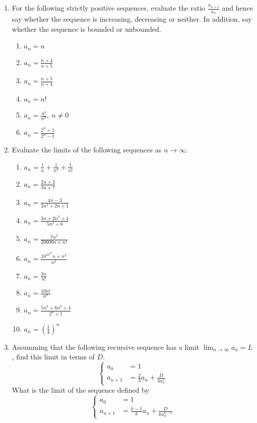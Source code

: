 \documentclass[11pt,a4paper,titlepage,oneside,openany]{article}
\numberwithin{equation}{section}
\numberwithin{algorithm}{section}
\numberwithin{figure}{section}
\numberwithin{table}{section}
\begin{document}
\begin{enumerate}
\item For the following strictly positive sequences, evaluate the ratio $\frac{a_{n+1}}{a_n}$ and hence say whether the sequence is increasing, decreasing or neither. In addition, say whether the sequence is bounded or unbounded.
  \begin{multicols}{2}
    \begin{enumerate}
    \item $a_n=n$
    \item $a_n=\frac{n+4}{n+5}$
    \item $a_n=\frac{n+5}{n+4}$
    \item $a_n=n!$
    \item $a_n=\frac{n!}{n^n},\ n\ne 0$
    \item $a_n=\frac{2^n+1}{2^n-1}$
    \end{enumerate}        
  \end{multicols}

\item Evaluate the limits of the following sequences as $n \to \infty$.
    \begin{multicols}{2}
    \begin{enumerate}
    \item $a_n=\frac{1}{n}+\frac{1}{n^2}+\frac{1}{n!}$
    \item $a_n=\frac{2n+2}{3n+7}$
    \item $a_n=\frac{4n-3}{2n^2+2n+1}$
    \item $a_n=\frac{3n+2n^2+1}{5n^2+6}$
    \item $a_n=\frac{7n^2}{20000n+n^2}$
    \item $a_n=\frac{10^{10^{10}}n+n^2}{n^2}$
    \item $a_n=\frac{3n}{n!}$
    \item $a_n=\frac{10n!}{n^n}$
    \item $a_n=\frac{5n^4+6n^2+4}{2^n+1}$
    \item $a_n=\left(\frac{1}{4} \right)^n$
    \end{enumerate}        
  \end{multicols}

\item Assumming that the following recursive sequence has a limit $\lim_{n\to \infty}a_n = L$, find this limit in terms of $D$.
  \begin{equation*}
    \begin{cases}
      a_0&=1\\
      a_{n+1}&=\frac{2}{3}a_n + \frac{D}{3 a_n^2}
    \end{cases}
  \end{equation*}
What is the limit of the sequence defined by
  \begin{equation*}
    \begin{cases}
      a_0&=1\\
      a_{n+1}&=\frac{k-1}{k}a_n + \frac{D}{k a_n^{k-1}}
    \end{cases}
  \end{equation*}


\end{enumerate}
\end{document}

